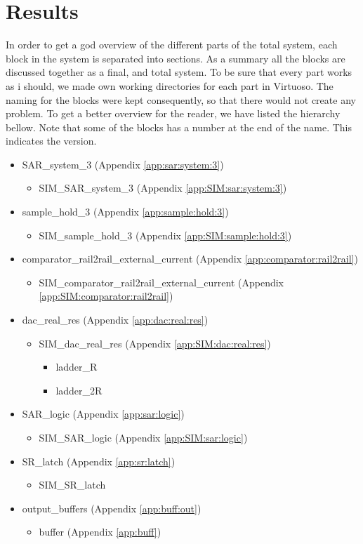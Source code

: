 \documentclass[english, 12pt, a4paper]{ifimaster}
\begin{document}
\chapter{Results} 
In order to get a god overview of the different parts of the total system, each block in the system is separated into sections. As a summary all the blocks are discussed together as a final, and 
total system. To be sure that every part works as i should, we made own working directories for each part in Virtuoso. The naming for the blocks were kept consequently, so that there would not create any problem. 
To get a better overview for the reader, we have listed the hierarchy bellow. Note that some of the blocks has a number at the end of the name. This indicates the version. 
\begin{itemize}
 \item SAR\_system\_3 (Appendix \ref{app:sar:system:3})
 \begin{itemize}
  \item SIM\_SAR\_system\_3 (Appendix \ref{app:SIM:sar:system:3})
 \end{itemize}
 \item sample\_hold\_3 (Appendix \ref{app:sample:hold:3})
 \begin{itemize}
  \item SIM\_sample\_hold\_3 (Appendix \ref{app:SIM:sample:hold:3})
 \end{itemize}
 \item comparator\_rail2rail\_external\_current (Appendix \ref{app:comparator:rail2rail})
 \begin{itemize}
  \item SIM\_comparator\_rail2rail\_external\_current (Appendix \ref{app:SIM:comparator:rail2rail})
 \end{itemize}
 \item dac\_real\_res (Appendix \ref{app:dac:real:res})
  \begin{itemize}
    \item SIM\_dac\_real\_res (Appendix \ref{app:SIM:dac:real:res})
    \begin{itemize}
        \item ladder\_R
        \item ladder\_2R
    \end{itemize}
 \end{itemize}
 \item SAR\_logic (Appendix \ref{app:sar:logic})
  \begin{itemize} 
  \item SIM\_SAR\_logic (Appendix \ref{app:SIM:sar:logic})
 \end{itemize}
 \item SR\_latch (Appendix \ref{app:sr:latch})
  \begin{itemize}
  \item SIM\_SR\_latch 
 \end{itemize}
  \item output\_buffers (Appendix \ref{app:buff:out})
    \begin{itemize}
      \item buffer (Appendix \ref{app:buff})
    \end{itemize}
\end{itemize}
\end{document}
